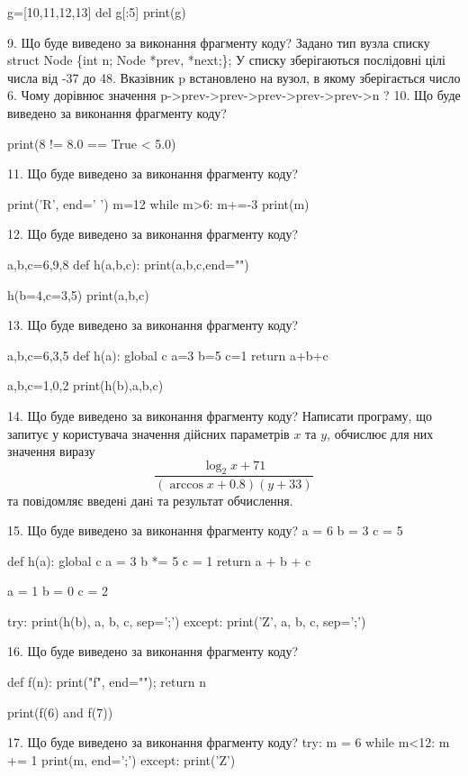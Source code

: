 \documentclass[11pt]{article}
\begin{document}
g=[10,11,12,13]
del g[:5]
print(g)


9. Що буде виведено за виконання фрагменту коду?
Задано тип вузла списку
struct Node \{int n; Node *prev, *next;\};
У списку зберігаються послідовні цілі числа від -37 до 48. Вказівник p встановлено на вузол, в якому зберігається число 6.
Чому дорівнює значення p->prev->prev->prev->prev->prev->n ?
10. Що буде виведено за виконання фрагменту коду?

print(8 != 8.0 == True < 5.0)

11. Що буде виведено за виконання фрагменту коду?

print('R', end=' ')
m=12
while m>6:
    m+=-3
print(m)


12. Що буде виведено за виконання фрагменту коду?

a,b,c=6,9,8
def h(a,b,c):
    print(a,b,c,end="")

h(b=4,c=3,5)
print(a,b,c)


13. Що буде виведено за виконання фрагменту коду?

a,b,c=6,3,5
def h(a):
global c    a=3
    b=5
    c=1
    return a+b+c

a,b,c=1,0,2
print(h(b),a,b,c)

14. Що буде виведено за виконання фрагменту коду?
Написати програму, що запитує у користувача значення дійсних параметрів $x$ та $y$, обчислює для них значення виразу 
$$\frac{\log_{2} x + 71}{(\arccos x + 0.8) (y + 33)}$$ 
та повiдомляє введенi данi та результат обчислення.


15. Що буде виведено за виконання фрагменту коду?
a = 6
b = 3
c = 5

def h(a):
global c    a = 3
    b *= 5
    c = 1
    return a + b + c

a = 1
b = 0
c = 2

try:
    print(h(b), a, b, c, sep=';')
except:
    print('Z', a, b, c, sep=';')

16. Що буде виведено за виконання фрагменту коду?

def f(n):
    print("f", end="");
    return n

print(f(6) and f(7))

17. Що буде виведено за виконання фрагменту коду?
try:
    m = 6
    while m<12:
        m += 1
    print(m, end=';')
except:
    print('Z')
\end{document}
